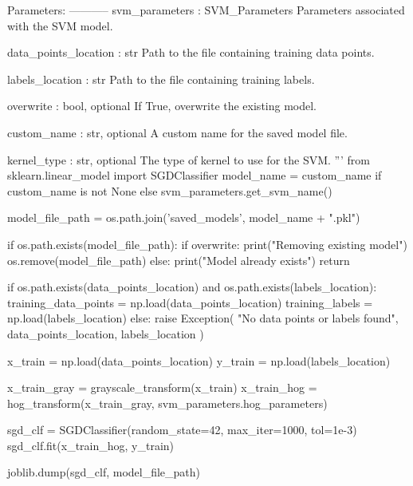 \begin{pythoncode}
    Parameters:
    -----------
    svm_parameters : SVM_Parameters
        Parameters associated with the SVM model.
    
    data_points_location : str
        Path to the file containing training data points.
    
    labels_location : str
        Path to the file containing training labels.
    
    overwrite : bool, optional
        If True, overwrite the existing model.
    
    custom_name : str, optional
        A custom name for the saved model file.
    
    kernel_type : str, optional
        The type of kernel to use for the SVM.
    '''
    from sklearn.linear_model import SGDClassifier
    model_name = custom_name if custom_name is not None else svm_parameters.get_svm_name()

    model_file_path = os.path.join('saved_models', model_name + ".pkl")

    if os.path.exists(model_file_path):
      if overwrite:
        print("Removing existing model")
        os.remove(model_file_path)
      else:
        print("Model already exists")
        return

    if os.path.exists(data_points_location) and os.path.exists(labels_location):
        training_data_points = np.load(data_points_location)
        training_labels = np.load(labels_location)
    else:
        raise Exception(
            "No data points or labels found",
            data_points_location,
            labels_location
        )

    x_train = np.load(data_points_location)
    y_train = np.load(labels_location)

    x_train_gray = grayscale_transform(x_train)
    x_train_hog = hog_transform(x_train_gray, svm_parameters.hog_parameters)

    sgd_clf = SGDClassifier(random_state=42, max_iter=1000, tol=1e-3)
    sgd_clf.fit(x_train_hog, y_train)

    joblib.dump(sgd_clf, model_file_path)


\end{pythoncode}

